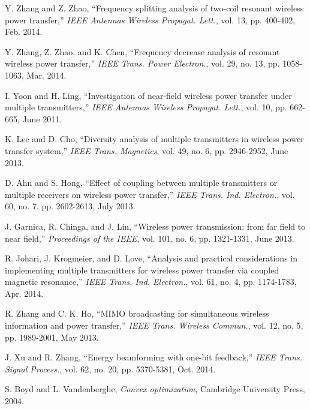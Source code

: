 \documentclass[onecolumn, a4size, 11pt]{IEEEtran}
\begin{document}
\begin{thebibliography}{27}
 Y. Zhang and Z. Zhao, ``Frequency splitting analysis of two-coil resonant wireless power transfer,'' {\it IEEE Antennas Wireless Propagat. Lett.}, vol. 13,   pp. 400-402, Feb. 2014.

 Y. Zhang, Z. Zhao, and K. Chen, ``Frequency decrease analysis of resonant wireless power transfer,''  {\it IEEE Trans. Power  Electron.}, vol. 29, no. 13,  pp. 1058-1063,  Mar. 2014.

 I. Yoon and H. Ling, ``Investigation of near-field wireless power transfer
under multiple transmitters,''  {\it IEEE Antennas Wireless Propagat. Lett.}, vol. 10,  pp. 662-665,  June 2011.


 K. Lee and D. Cho, ``Diversity analysis of multiple transmitters in wireless power transfer system,'' {\it IEEE Trans. Magnetics}, vol. 49, no. 6, pp. 2946-2952, June 2013.

 D. Ahn and S. Hong, ``Effect of coupling between multiple transmitters or multiple receivers on wireless power transfer,'' {\it IEEE Trans. Ind. Electron.}, vol. 60, no. 7, pp. 2602-2613, July 2013.


 J. Garnica, R.  Chinga,  and
J. Lin, ``Wireless power transmission: from far field to near field,'' {\it Proceedings of the IEEE}, vol. 101, no. 6, pp. 1321-1331, June 2013.

 R. Johari, J.  Krogmeier, and D. Love, ``Analysis and practical considerations in implementing multiple transmitters for wireless power transfer via coupled magnetic resonance,'' {\it IEEE Trans. Ind. Electron.}, vol. 61, no. 4, pp. 1174-1783, Apr. 2014.


 R. Zhang and C. K. Ho, ``MIMO broadcasting for simultaneous wireless information and power transfer,'' {\it IEEE Trans. Wireless Commun.}, vol. 12, no. 5, pp. 1989-2001, May  2013.

 J. Xu and R. Zhang, ``Energy beamforming with one-bit feedback,'' {\it IEEE Trans. Signal  Process.}, vol. 62, no. 20, pp. 5370-5381, Oct. 2014.









 S. Boyd and L. Vandenberghe, {\it Convex optimization}, Cambridge University Press, 2004.

\end{thebibliography}
\end{document}
